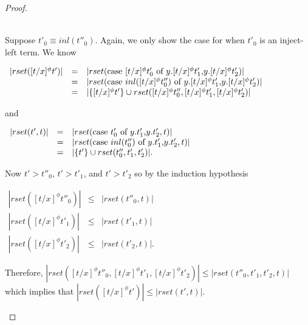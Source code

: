 \begin{proof}
\begin{itemize}
  \ \\
  Suppose $t'_0 \equiv inl(t''_0)$.  Again, we only show the case for when $t'_0$ is an inject-left term.
  We know 
  \begin{center}
    \begin{math}
      \begin{array}{lll}
        |rset([t/x]^\phi t')| & = & |rset(\mbox{case}\ [t/x]^\phi t'_0\ \text{of}\ y\text{.}[t/x]^\phi t'_1\text{,}y\text{.}[t/x]^\phi t'_2)|\\
        & = & |rset(\mbox{case}\ inl([t/x]^\phi t''_0)\ \text{of}\ y\text{.}[t/x]^\phi t'_1\text{,}y\text{.}[t/x]^\phi t'_2)|\\
        & = & |\{[t/x]^\phi t'\} \cup rset([t/x]^\phi t''_0, [t/x]^\phi t'_1, [t/x]^\phi t'_2)|
      \end{array}
    \end{math}
  \end{center}
  and
  \begin{center}
    \begin{math}
      \begin{array}{lll}
        |rset(t',t)| & = & |rset(\mbox{case}\ t'_0\ \text{of}\ y\text{.}t'_1\text{,}y\text{.}t'_2,t)|\\
        & = & |rset(\mbox{case}\ inl(t''_0)\ \text{of}\ y\text{.}t'_1\text{,}y\text{.}t'_2,t)|\\
        & = & |\{t'\} \cup rset(t''_0, t'_1,t'_2)|.
      \end{array}
    \end{math}
  \end{center}
  Now $t' > t''_0$, $t' > t'_1$, and $t' > t'_2$ so by the induction hypothesis
  \begin{center}
    \begin{math}
      \begin{array}{lll}
        |rset([t/x]^\phi t''_0)| & \leq & |rset(t''_0,t)|\\
        |rset([t/x]^\phi t'_1)|  & \leq & |rset(t'_1,t)|\\
        |rset([t/x]^\phi t'_2)|  & \leq & |rset(t'_2,t)|.
      \end{array}
    \end{math}
  \end{center}
  Therefore, $|rset([t/x]^\phi t''_0, [t/x]^\phi t'_1, [t/x]^\phi t'_2)| \leq |rset(t''_0, t'_1, t'_2, t)|$
  which implies that $|rset([t/x]^\phi t')| \leq |rset(t',t)|$.
  

\end{itemize}
\end{proof}
